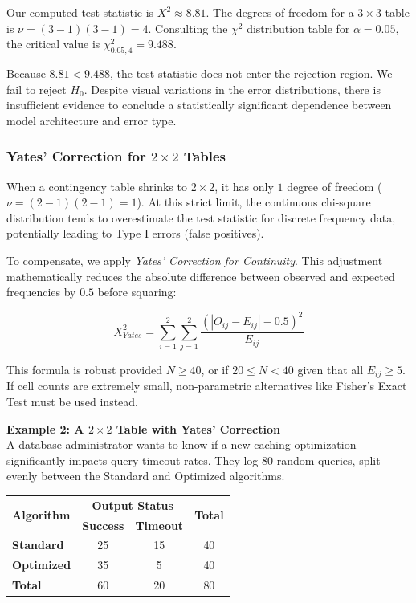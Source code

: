 \documentclass{article}
\begin{document}
Our computed test statistic is $X^2 \approx 8.81$. The degrees of freedom for a $3 \times 3$ table is $\nu = (3-1)(3-1) = 4$. Consulting the $\chi^2$ distribution table for $\alpha = 0.05$, the critical value is $\chi^2_{0.05, 4} = 9.488$. 

Because $8.81 < 9.488$, the test statistic does not enter the rejection region. We fail to reject $H_0$. Despite visual variations in the error distributions, there is insufficient evidence to conclude a statistically significant dependence between model architecture and error type.

\subsubsection{Yates' Correction for $2 \times 2$ Tables}

When a contingency table shrinks to $2 \times 2$, it has only $1$ degree of freedom ($\nu = (2-1)(2-1) = 1$). At this strict limit, the continuous chi-square distribution tends to overestimate the test statistic for discrete frequency data, potentially leading to Type I errors (false positives). 

To compensate, we apply \emph{Yates' Correction for Continuity}. This adjustment mathematically reduces the absolute difference between observed and expected frequencies by $0.5$ before squaring:

$$ X^2_{Yates} = \sum_{i=1}^{2} \sum_{j=1}^{2} \frac{(|O_{ij} - E_{ij}| - 0.5)^2}{E_{ij}} $$

This formula is robust provided $N \geq 40$, or if $20 \leq N < 40$ given that all $E_{ij} \geq 5$. If cell counts are extremely small, non-parametric alternatives like Fisher's Exact Test must be used instead.

\vspace{1em}
\textbf{Example 2: A $2 \times 2$ Table with Yates' Correction} \\
A database administrator wants to know if a new caching optimization significantly impacts query timeout rates. They log $80$ random queries, split evenly between the Standard and Optimized algorithms.

\begin{table}[h]
\centering
\begin{tabular}{l|cc|c}
\hline
\multirow{2}{*}{\textbf{Algorithm}} & \multicolumn{2}{c|}{\textbf{Output Status}} & \multirow{2}{*}{\textbf{Total}} \\
 & \textbf{Success} & \textbf{Timeout} & \\ \hline
\textbf{Standard} & 25 & 15 & 40 \\
\textbf{Optimized} & 35 & 5 & 40 \\ \hline
\textbf{Total} & 60 & 20 & 80 \\ \hline \hline
\end{tabular}
\end{table}
\end{document}
